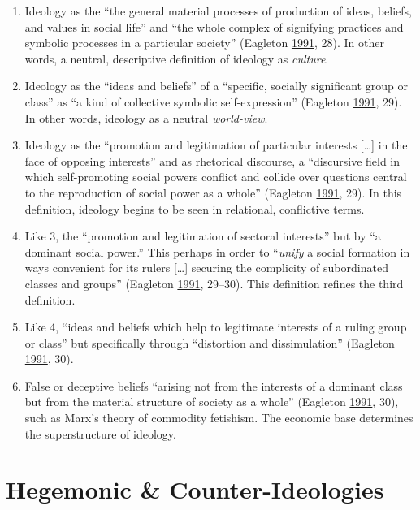 \documentclass[10pt,british,A4paper,twoside]{memoir}
\providecommand{\tightlist}{%
  \setlength{\itemsep}{0pt}\setlength{\parskip}{0pt}}
\begin{document}
\begin{enumerate}
\def\labelenumi{\arabic{enumi}.}
\tightlist
\item
  Ideology as the ``the general material processes of production of
  ideas, beliefs, and values in social life'' and ``the whole complex of
  signifying practices and symbolic processes in a particular society''
  (Eagleton \protect\hyperlink{ref-eagleton_ideology:_1991}{1991}, 28).
  In other words, a neutral, descriptive definition of ideology as
  \emph{culture}.
\item
  Ideology as the ``ideas and beliefs'' of a ``specific, socially
  significant group or class'' as ``a kind of collective symbolic
  self-expression'' (Eagleton
  \protect\hyperlink{ref-eagleton_ideology:_1991}{1991}, 29). In other
  words, ideology as a neutral \emph{world-view}.
\item
  Ideology as the ``promotion and legitimation of particular interests
  {[}\ldots{}{]} in the face of opposing interests'' and as rhetorical
  discourse, a ``discursive field in which self-promoting social powers
  conflict and collide over questions central to the reproduction of
  social power as a whole'' (Eagleton
  \protect\hyperlink{ref-eagleton_ideology:_1991}{1991}, 29). In this
  definition, ideology begins to be seen in relational, conflictive
  terms.
\item
  Like 3, the ``promotion and legitimation of sectoral interests'' but
  by ``a dominant social power.'' This perhaps in order to
  ``\emph{unify} a social formation in ways convenient for its rulers
  {[}\ldots{}{]} securing the complicity of subordinated classes and
  groups'' (Eagleton
  \protect\hyperlink{ref-eagleton_ideology:_1991}{1991}, 29--30). This
  definition refines the third definition.
\item
  Like 4, ``ideas and beliefs which help to legitimate interests of a
  ruling group or class'' but specifically through ``distortion and
  dissimulation'' (Eagleton
  \protect\hyperlink{ref-eagleton_ideology:_1991}{1991}, 30).
\item
  False or deceptive beliefs ``arising not from the interests of a
  dominant class but from the material structure of society as a whole''
  (Eagleton \protect\hyperlink{ref-eagleton_ideology:_1991}{1991}, 30),
  such as Marx's theory of commodity fetishism. The economic base
  determines the superstructure of ideology.
\end{enumerate}

\section{Hegemonic \&
Counter-Ideologies}\label{hegemonic-counter-ideologies}
\end{document}
